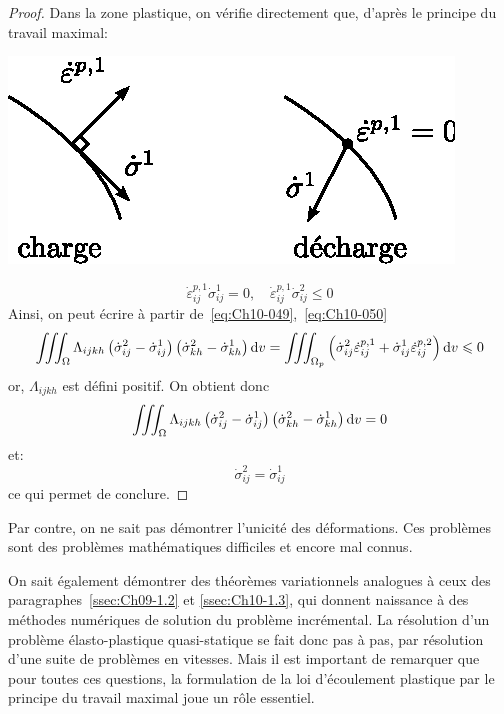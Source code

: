 \begin{proof}
    Dans la zone plastique, on vérifie directement que, d'après le principe du travail maximal: 
    \begin{center}
        \includegraphics{../images/T1_Ch10-16}
    \end{center}
    \begin{equation}
        \dot{\varepsilon}_{ij}^{p,1} \dot{\sigma}_{ij}^1 = 0, \quad \dot{\varepsilon}_{ij}^{p,1} \dot{\sigma}_{ij}^2 \leq 0
        \label{eq:Ch10-050}
    \end{equation}
    Ainsi, on peut écrire à partir de~\eqref{eq:Ch10-049},~\eqref{eq:Ch10-050}
    \begin{equation}
        \iiint_{\Omega} \Lambda_{ijkh} \left( \dot{\sigma}_{ij}^2 - \dot{\sigma}_{ij}^1 \right) \left( \dot{\sigma}_{kh}^2 - \dot{\sigma}_{kh}^1 \right) \mathop{\mathrm{{}d}}\mathopen{} v = \iiint_{\Omega_p} \left( \dot{\sigma}_{ij}^2 \dot{\varepsilon}_{ij}^{p,1} + \dot{\sigma}_{ij}^1 \dot{\varepsilon}_{ij}^{p,2} \right) \mathop{\mathrm{{}d}}\mathopen{} v \leqslant 0
        \label{eq:Ch10-051}
    \end{equation}
    or, $\Lambda_{ijkh}$ est défini positif.
    On obtient donc
    \begin{equation}
        \iiint_{\Omega} \Lambda_{ijkh} \left( \dot{\sigma}_{ij}^2 - \dot{\sigma}_{ij}^1 \right) \left( \dot{\sigma}_{kh}^2 - \dot{\sigma}_{kh}^1 \right) \mathop{\mathrm{{}d}}\mathopen{} v = 0
        \label{eq:Ch10-052}
    \end{equation}
et:
    \begin{equation}
        \dot{\sigma}_{ij}^2 = \dot{\sigma}_{ij}^1
        \label{eq:Ch10-053}
    \end{equation}
ce qui permet de conclure.
\end{proof}

Par contre, on ne sait pas démontrer l'unicité des déformations. 
Ces problèmes sont des problèmes mathématiques difficiles et encore mal connus.

On sait également démontrer des théorèmes variationnels analogues à ceux des paragraphes~\ref{ssec:Ch09-1.2} et \ref{ssec:Ch10-1.3}, qui donnent naissance à des méthodes numériques de solution du problème incrémental.
La résolution d'un problème élasto-plastique quasi-statique se fait donc pas à pas, par résolution d'une suite de problèmes en vitesses.
Mais il est important de remarquer que pour toutes ces questions, la formulation de la loi d'écoulement plastique par le principe du travail maximal joue un rôle essentiel. 

